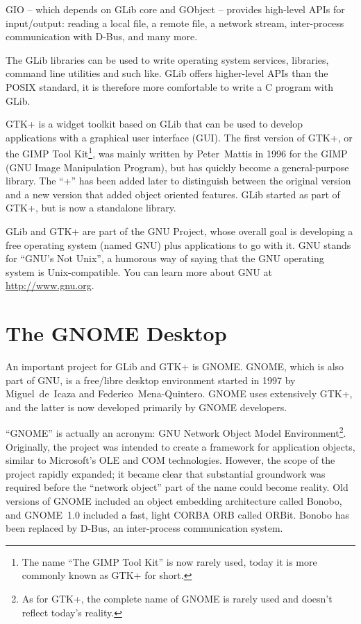 GIO -- which depends on GLib core and GObject -- provides high-level APIs for input/output: reading a local file, a remote file, a network stream, inter-process communication with D-Bus, and many more.

The GLib libraries can be used to write operating system services, libraries, command line utilities and such like. GLib offers higher-level APIs than the POSIX standard, it is therefore more comfortable to write a C program with GLib.

GTK+ is a widget toolkit based on GLib that can be used to develop applications with a graphical user interface (GUI). The first version of GTK+, or the GIMP Tool Kit\footnote{The name ``The GIMP Tool Kit'' is now rarely used, today it is more commonly known as GTK+ for short.}, was mainly written by Peter~Mattis in 1996 for the GIMP (GNU Image Manipulation Program), but has quickly become a general-purpose library. The ``+'' has been added later to distinguish between the original version and a new version that added object oriented features. GLib started as part of GTK+, but is now a standalone library.

GLib and GTK+ are part of the GNU Project, whose overall goal is developing a free operating system (named GNU) plus applications to go with it. GNU stands for ``GNU's Not Unix'', a humorous way of saying that the GNU operating system is Unix-compatible. You can learn more about GNU at \url{http://www.gnu.org}.

\section{The GNOME Desktop}

An important project for GLib and GTK+ is GNOME. GNOME, which is also part of GNU, is a free/libre desktop environment started in 1997 by Miguel~de~Icaza and Federico~Mena-Quintero. GNOME uses extensively GTK+, and the latter is now developed primarily by GNOME developers.

``GNOME'' is actually an acronym: GNU Network Object Model Environment\footnote{As for GTK+, the complete name of GNOME is rarely used and doesn't reflect today's reality.}. Originally, the project was intended to create a framework for application objects, similar to Microsoft's OLE and COM technologies. However, the scope of the project rapidly expanded; it became clear that substantial groundwork was required before the ``network object'' part of the name could become reality. Old versions of GNOME included an object embedding architecture called Bonobo, and GNOME~1.0 included a fast, light CORBA ORB called ORBit. Bonobo has been replaced by D-Bus, an inter-process communication system.

